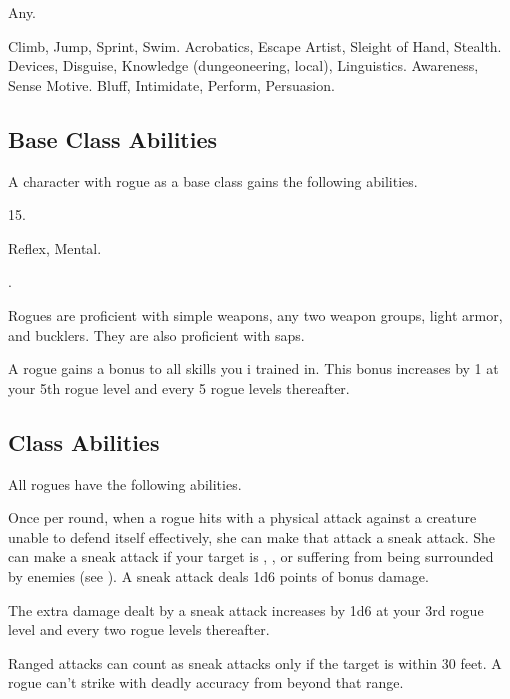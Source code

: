      Any.

     Climb, Jump, Sprint, Swim.
     Acrobatics, Escape Artist, Sleight of Hand, Stealth.
     Devices, Disguise, Knowledge (dungeoneering, local), Linguistics.
     Awareness, Sense Motive.
     Bluff, Intimidate, Perform, Persuasion.

    \subsection{Base Class Abilities}
        A character with rogue as a base class gains the following abilities.

         15.

          Reflex,  Mental.

         .

        Rogues are proficient with simple weapons, any two weapon groups, light armor, and bucklers.
        They are also proficient with saps.

        A rogue gains a  bonus to all skills you i trained in.
        This bonus increases by 1 at your 5th rogue level and every 5 rogue levels thereafter.

    \subsection{Class Abilities}
        All rogues have the following abilities.

        Once per round, when a rogue hits with a physical attack against a creature unable to defend itself effectively, she can make that attack a sneak attack.
        She can make a sneak attack if your target is \unaware, , or suffering  from being surrounded by enemies (see ).
        A sneak attack deals 1d6 points of bonus damage.

        The extra damage dealt by a sneak attack increases by 1d6 at your 3rd rogue level and every two rogue levels thereafter.

        Ranged attacks can count as sneak attacks only if the target is within 30 feet.
        A rogue can't strike with deadly accuracy from beyond that range.

